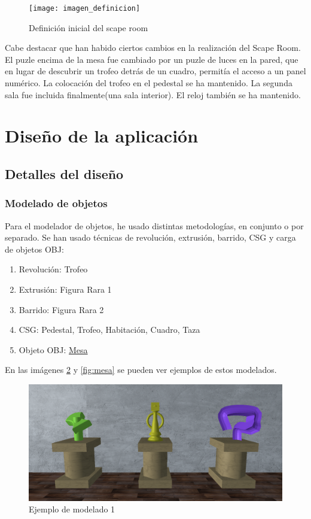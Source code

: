 \begin{figure}[H]
  \centering
  \texttt{[image: imagen\_definicion]}
  \caption{Definición inicial del scape room}
  \label{fig:definicion}
\end{figure}

Cabe destacar que han habido ciertos cambios en la realización del Scape Room. El puzle encima de la mesa fue cambiado por un puzle de luces en la pared, que en lugar de descubrir un trofeo detrás de un cuadro, permitía el acceso a un panel numérico. La colocación del trofeo en el pedestal se ha mantenido. La segunda sala fue incluida finalmente(una sala interior). El reloj también se ha mantenido.

\section{Diseño de la aplicación}

\subsection{Detalles del diseño}
\subsubsection{Modelado de objetos}
Para el modelador de objetos, he usado distintas metodologías, en conjunto o por separado. Se han usado técnicas de revolución, extrusión, barrido, CSG y carga de objetos OBJ:

\begin{enumerate}
\item Revolución: Trofeo
\item Extrusión: Figura Rara 1 
\item Barrido: Figura Rara 2
\item CSG: Pedestal, Trofeo, Habitación, Cuadro, Taza
\item Objeto OBJ: \href{https://free3d.com/3d-model/cinema4d-table-66762.html}{Mesa}
\end{enumerate}

En las imágenes \ref{fig:figuras} y \ref{fig:mesa} se pueden ver ejemplos de estos modelados.

\begin{figure}[H]
  \centering
  \includegraphics[scale=0.3]{piezas}
  \caption{Ejemplo de modelado 1}
  \label{fig:figuras}
\end{figure}

